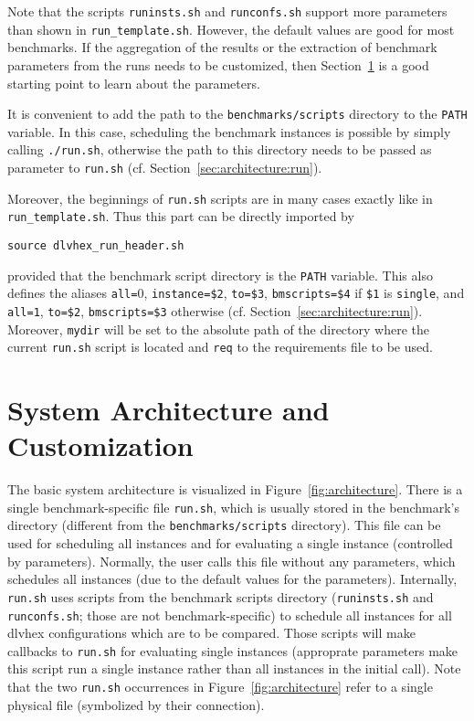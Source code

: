 \documentclass[a4paper]{article}
\newcommand{\dlvhex}{{\sc dlvhex}}
\begin{document}
		Note that the scripts {\tt runinsts.sh} and {\tt runconfs.sh} support more
		parameters than shown in {\tt run\_template.sh}.
		However, the default values are good for most benchmarks.
		If the aggregation of the results or
		the extraction of benchmark parameters from the runs needs to be customized,
		then Section~\ref{sec:architecture} is a good starting point to learn about the parameters.
		
		It is convenient to add the path to the {\tt benchmarks/scripts} directory to the {\tt PATH} variable.
		In this case, scheduling the benchmark instances is possible by simply calling {\tt ./run.sh},
		otherwise the path to this directory needs to be passed as parameter to {\tt run.sh}
		(cf. Section~\ref{sec:architecture:run}).

		Moreover, the beginnings of {\tt run.sh} scripts are in many cases exactly
		like in {\tt run\_template.sh}. Thus this part can be directly imported by
		\begin{center}
			{\tt source dlvhex\_run\_header.sh}
		\end{center}
		provided that the benchmark script directory is the {\tt PATH} variable.
		This also defines the aliases
		{\tt all=$0$}, {\tt instance=\$2}, {\tt to=\$3}, {\tt bmscripts=\$4}
		if {\tt \$1} is {\tt single}, and
		{\tt all=1}, {\tt to=\$2}, {\tt bmscripts=\$3} otherwise (cf. Section~\ref{sec:architecture:run}).
		Moreover, {\tt mydir} will be set to the absolute path of the directory where
		the current {\tt run.sh} script is located and {\tt req} to the requirements file to be used.
			
	\section{System Architecture and Customization}
	\label{sec:architecture}

		The basic system architecture is visualized in Figure~\ref{fig:architecture}.
		There is a single benchmark-specific file {\tt run.sh}, which is usually stored
		in the benchmark's directory (different from the {\tt benchmarks/scripts} directory).
		This file can be used for scheduling all instances and for evaluating a single instance
		(controlled by parameters). Normally, the user calls this file without any parameters,
		which schedules all instances (due to the default values for the parameters).
		Internally, {\tt run.sh} uses scripts from the benchmark scripts directory
		({\tt runinsts.sh} and {\tt runconfs.sh}; those are not benchmark-specific) to schedule all instances for all \dlvhex{} configurations
		which are to be compared. Those scripts will make callbacks to {\tt run.sh} for evaluating single instances
		(approprate parameters make this script run a single instance rather than all instances in the initial call).
		Note that the two {\tt run.sh} occurrences in Figure~\ref{fig:architecture} refer
		to a single physical file (symbolized by their connection).
		
\end{document}
